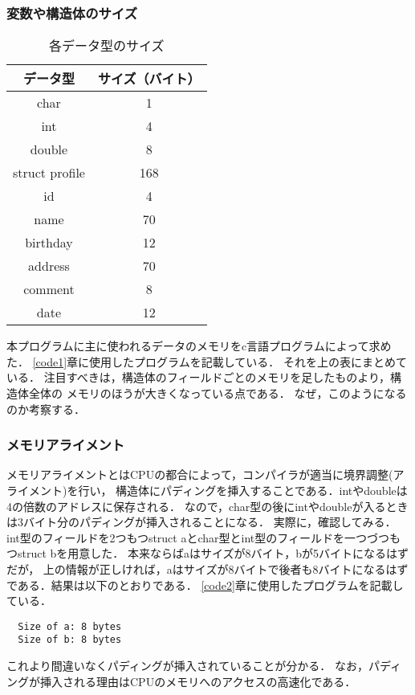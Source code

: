 \subsubsection{変数や構造体のサイズ}
\begin{table}[h]
  \centering
  \begin{tabular}{|c|c|}
      \hline
      \textbf{データ型} & \textbf{サイズ（バイト）} \\
      \hline
      char & 1 \\
      \hline
      int & 4 \\
      \hline
      double & 8 \\
      \hline
      struct profile & 168 \\
      \hline
      id & 4 \\
      \hline
      name & 70 \\
      \hline
      birthday & 12 \\
      \hline
      address & 70 \\
      \hline
      comment & 8 \\
      \hline
      date & 12 \\
      \hline
  \end{tabular}
  \caption{各データ型のサイズ}
  \label{tab:data_sizes}
\end{table}
本プログラムに主に使われるデータのメモリをc言語プログラムによって求めた．
\ref{code1}章に使用したプログラムを記載している．
それを上の表にまとめている．
注目すべきは，構造体のフィールドごとのメモリを足したものより，構造体全体の
メモリのほうが大きくなっている点である．
なぜ，このようになるのか考察する．
\subsubsection{メモリアライメント}
メモリアライメントとはCPUの都合によって，コンパイラが適当に境界調整(アライメント)を行い，
構造体にパディングを挿入することである．intやdoubleは4の倍数のアドレスに保存される．
なので，char型の後にintやdoubleが入るときは3バイト分のパディングが挿入されることになる．
実際に，確認してみる．
int型のフィールドを2つもつstruct aとchar型とint型のフィールドを一つづつもつstruct bを用意した．
本来ならばaはサイズが8バイト，bが5バイトになるはずだが，
上の情報が正しければ，aはサイズが8バイトで後者も8バイトになるはずである．結果は以下のとおりである．
\ref{code2}章に使用したプログラムを記載している．

\begin{verbatim}
  Size of a: 8 bytes
  Size of b: 8 bytes
\end{verbatim}
これより間違いなくパディングが挿入されていることが分かる．
なお，パディングが挿入される理由はCPUのメモリへのアクセスの高速化である．\cite{www:label}
